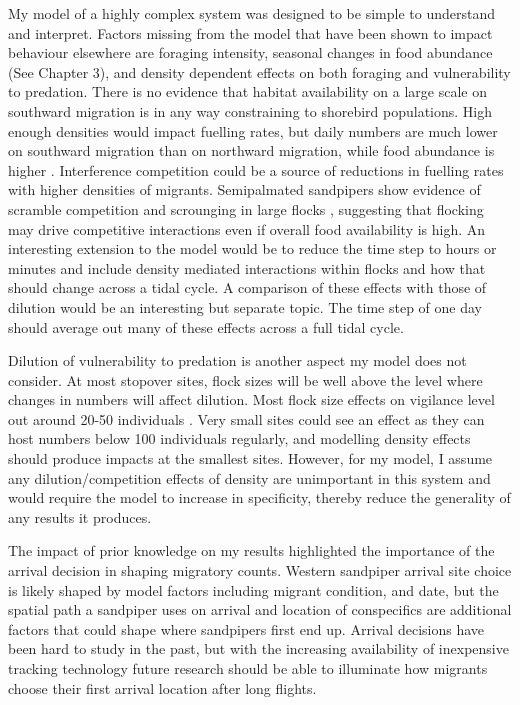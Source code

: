 My model of a highly complex system was designed to be simple to understand and interpret. Factors missing from the model that have been shown to impact behaviour elsewhere are foraging intensity, seasonal changes in food abundance (See Chapter 3), and density dependent effects on both foraging and vulnerability to predation. There is no evidence that habitat availability on a large scale on southward migration is in any way constraining to shorebird populations. High enough densities would impact fuelling rates, but daily numbers are much lower on southward migration than on northward migration, while food abundance is higher \citep[Chapter 3]{Pomeroy2006a,drever_monitoring_2014}. Interference competition could be a source of reductions in fuelling rates with higher densities of migrants. Semipalmated sandpipers show evidence of scramble competition and scrounging in large flocks \citep{Beauchamp2014,Beauchamp2012}, suggesting that flocking may drive competitive interactions even if overall food availability is high. An interesting extension to the model would be to reduce the time step to hours or minutes and include density mediated interactions within flocks and how that should change across a tidal cycle. A comparison of these effects with those of dilution would be an interesting but separate topic. The time step of one day should average out many of these effects across a full tidal cycle. 

Dilution of vulnerability to predation is another aspect my model does not consider. At most stopover sites, flock sizes will be well above the level where changes in numbers will affect dilution. Most flock size effects on vigilance level out around 20-50 individuals \citep{Elgar1989,Lima1995,Roberts1996}. Very small sites could see an effect as they can host numbers below 100 individuals regularly, and modelling density effects should produce impacts at the smallest sites. However, for my model, I assume any dilution/competition effects of density are unimportant in this system and would require the model to increase in specificity, thereby reduce the generality of any results it produces. 

The impact of prior knowledge on my results highlighted the importance of the arrival decision in shaping migratory counts. Western sandpiper arrival site choice is likely shaped by model factors including migrant condition, and date, but the spatial path a sandpiper uses on arrival and location of conspecifics are additional factors that could shape where sandpipers first end up. Arrival decisions have been hard to study in the past, but with the increasing availability of inexpensive tracking technology future research should be able to illuminate how migrants choose their first arrival location after long flights. 

